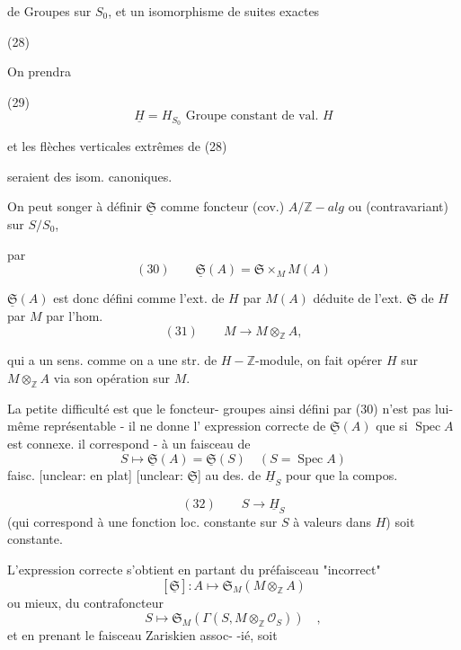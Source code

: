 de Groupes sur $S_0$, et un isomorphisme de suites exactes

(28)

On prendra

(29) $$\underline{H} = H_{S_0} \text{ Groupe constant de val. } H$$

et les flèches verticales extrêmes de (28)

\newpage


seraient des isom. canoniques.

On peut songer à définir $\underline{\mathfrak{S}}$ comme
foncteur (cov.) $A/\mathbb{Z}-alg$ ou (contravariant) sur $S/S_0$,

par
$$(30) \qquad \underline{\mathfrak{S}}(A) = \mathfrak{S} \times_M M(A)$$

$\underline{\mathfrak{S}}(A)$ est donc défini comme l'ext. de
$H$ par $M(A)$ déduite de l'ext. $\mathfrak{S}$
de $H$ par $M$ par l'hom.
$$(31) \qquad M \longrightarrow M \otimes_{\mathbb{Z}} A ,$$

qui a un sens. comme on a une
str. de $H-\mathbb{Z}$-module, on fait opérer $H$
sur $M \otimes_{\mathbb{Z}} A$ via son opération sur $M$.

La petite difficulté est que le foncteur-
groupes ainsi défini par (30) n'est pas
lui-même représentable - il ne donne l'
expression correcte de $\underline{\mathfrak{S}}(A)$ que si
$\operatorname{Spec} A$ est connexe. il correspond -
à un faisceau de
$$S \mapsto \underline{\mathfrak{S}}(A) = \underline{\mathfrak{S}}(S) \quad (S = \operatorname{Spec} A)$$
faisc. [unclear: en plat] [unclear: $\underline{\mathfrak{S}}$] au des. de $\underline{H}_S$ pour que la compos.

$$(32) \qquad S \longrightarrow \underline{H}_S$$
(qui correspond à une fonction loc. constante
sur $S$ à valeurs dans $H$) soit constante.

\newpage


L'expression correcte s'obtient en partant
du préfaisceau "incorrect"
$$[\underline{\mathfrak{S}}] : A \longmapsto \mathfrak{S}_{M}(M \otimes_{\mathbb{Z}} A)$$
ou mieux, du contrafoncteur
$$S \longmapsto \mathfrak{S}_{M}(\Gamma(S, M \otimes_{\mathbb{Z}} \mathcal{O}_S)) \quad ,$$
et en prenant le faisceau Zariskien assoc-
-ié, soit

